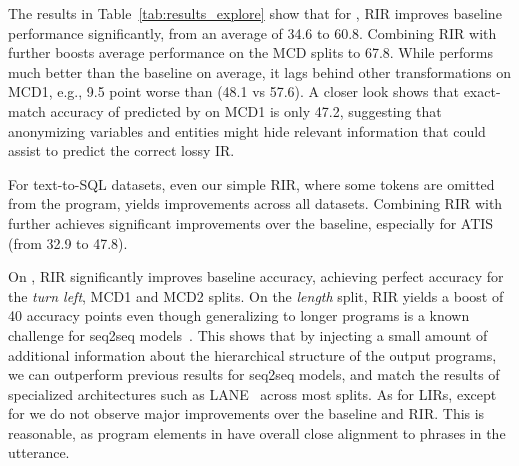 The results in Table~\ref{tab:results_explore} show that for \cfq{}, RIR improves baseline performance significantly, from an average of 34.6 to 60.8.
Combining RIR with \LIRind{} further boosts average performance on the MCD splits to 67.8. While \LIRdir{} performs much better than the baseline on average, it lags behind other transformations on MCD1, e.g., 9.5 point worse than \LIRind{} (48.1 vs 57.6). A closer look shows that exact-match accuracy of  predicted by  on MCD1 is only 47.2, suggesting that anonymizing variables and entities might hide relevant information that could assist  to predict the correct lossy IR.

For text-to-SQL datasets, even our simple RIR, where some tokens are omitted from the program, yields improvements across all datasets. Combining RIR with \LIRdir{} further achieves significant improvements over the baseline, especially for ATIS (from 32.9 to 47.8).

On \scan{}, RIR significantly improves baseline accuracy, achieving perfect accuracy for the \emph{turn left}, MCD1 and MCD2 splits. On the \emph{length} split, RIR yields a boost of 40 accuracy points even though generalizing to longer programs is a known challenge for seq2seq models~\cite{newman-etal-2020-eos}. 
This shows that by injecting a small amount of additional information about the hierarchical structure of the output programs, we can outperform previous results for seq2seq models, and match the results of specialized architectures such as LANE~\cite{liu2020compositional} across most splits.
As for LIRs, except for \LIRdir{} we do not observe major improvements over the baseline and RIR. This is reasonable, as program elements in \scan{} have overall close alignment to phrases in the utterance.

